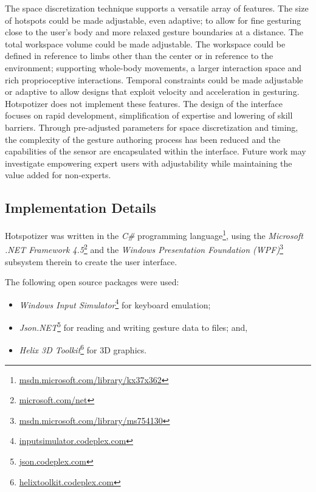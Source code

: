 The space discretization technique supports a versatile array of features. The size of hotspots could be made adjustable, even adaptive; to allow for fine gesturing close to the user’s body and more relaxed gesture boundaries at a distance. The total workspace volume could be made adjustable. The workspace could be defined in reference to limbs other than the center or in reference to the environment; supporting whole-body movements, a larger interaction space and rich proprioceptive interactions. Temporal constraints could be made adjustable or adaptive to allow designs that exploit velocity and acceleration in gesturing. Hotspotizer does not implement these features. The design of the interface focuses on rapid development, simplification of expertise and lowering of skill barriers. Through pre-adjusted parameters for space discretization and timing, the complexity of the gesture authoring process has been reduced and  the capabilities of the sensor are encapsulated within the interface. Future work may investigate empowering expert users with adjustability while maintaining the value added for non-experts.

\clearpage

\subsection{Implementation Details}

Hotspotizer was written in the \emph{C\#} programming language\footnote{\href{http://msdn.microsoft.com/en-us/library/kx37x362.aspx}{msdn.microsoft.com/library/kx37x362}}, using the \emph{Microsoft .NET Framework 4.5}\footnote{\href{http://www.microsoft.com/net}{microsoft.com/net}} and the \emph{Windows Presentation Foundation (WPF)}\footnote{\href{http://msdn.microsoft.com/en-us/library/ms754130.aspx}{msdn.microsoft.com/library/ms754130}} subsystem therein to create the user interface.

The following open source packages were used:

\begin{itemize}
\item \emph{Windows Input Simulator}\footnote{\href{http://inputsimulator.codeplex.com/}{inputsimulator.codeplex.com}} for keyboard emulation;
\item \emph{Json.NET}\footnote{\href{http://json.codeplex.com/}{json.codeplex.com}} for reading and writing gesture data to files; and,
\item \emph{Helix 3D Toolkit}\footnote{\href{http://helixtoolkit.codeplex.com/}{helixtoolkit.codeplex.com}} for 3D graphics.
\end{itemize}

